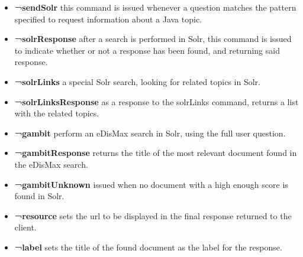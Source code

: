 \begin{itemize}
 \item \textbf{¬sendSolr} this command is issued whenever a question matches the pattern specified to request information about a Java topic.
 \item \textbf{¬solrResponse} after a search is performed in Solr, this command is issued to indicate whether or not a response has been found, and returning said response.
 \item \textbf{¬solrLinks} a special Solr search, looking for related topics in Solr.
 \item \textbf{¬solrLinksResponse} as a response to the solrLinks command, returns a list with the related topics.
 \item \textbf{¬gambit} perform an \ac{eDisMax} search in Solr, using the full user question.
 \item \textbf{¬gambitResponse} returns the title of the most relevant document found in the \ac{eDisMax} search.
 \item \textbf{¬gambitUnknown} issued when no document with a high enough score is found in Solr.
 \item \textbf{¬resource} sets the url to be displayed in the final response returned to the client.
 \item \textbf{¬label} sets the title of the found document as the label for the response.
\end{itemize}

